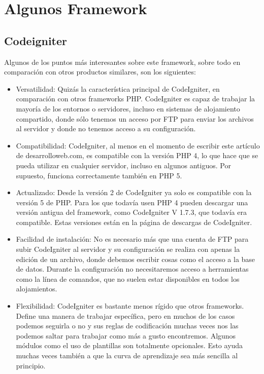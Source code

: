 
\section{Algunos Framework}

\subsection{Codeigniter}

Algunos de los puntos más interesantes sobre este framework, sobre todo en comparación con otros productos similares, son los siguientes:


\begin{itemize}

\item Versatilidad: Quizás la característica principal de CodeIgniter, en comparación con otros frameworks PHP. CodeIgniter es capaz de trabajar la mayoría de los entornos o servidores, incluso en sistemas de alojamiento compartido, donde sólo tenemos un acceso por FTP para enviar los archivos al servidor y donde no tenemos acceso a su configuración.


\item Compatibilidad: CodeIgniter, al menos en el momento de escribir este artículo de desarrolloweb.com, es compatible con la versión PHP 4, lo que hace que se pueda utilizar en cualquier servidor, incluso en algunos antiguos. Por supuesto, funciona correctamente también en PHP 5.

\item Actualizado: Desde la versión 2 de CodeIgniter ya solo es compatible con la versión 5 de PHP. Para los que todavía usen PHP 4 pueden descargar una versión antigua del framework, como CodeIgniter V 1.7.3, que todavía era compatible. Estas versiones están en la página de descargas de CodeIgniter.

\item Facilidad de instalación: No es necesario más que una cuenta de FTP para subir CodeIgniter al servidor y su configuración se realiza con apenas la edición de un archivo, donde debemos escribir cosas como el acceso a la base de datos. Durante la configuración no necesitaremos acceso a herramientas como la línea de comandos, que no suelen estar disponibles en todos los alojamientos.

\item Flexibilidad: CodeIgniter es bastante menos rígido que otros frameworks. Define una manera de trabajar específica, pero en muchos de los casos podemos seguirla o no y sus reglas de codificación muchas veces nos las podemos saltar para trabajar como más a gusto encontremos. Algunos módulos como el uso de plantillas son totalmente opcionales. Esto ayuda muchas veces también a que la curva de aprendizaje sea más sencilla al principio.


\end{itemize}
